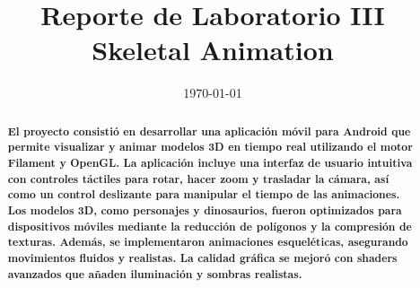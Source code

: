 \documentclass[conference]{IEEEtran}
\date{\specialdate\today}
\begin{document}
%
%
%

\newcommand{\breite}{0.9} %
\newcommand{\RelacionFiguradoscolumnas}{0.9}
\newcommand{\RelacionFiguradoscolumnasPuntoCinco}{0.45}




\title{Reporte de Laboratorio III \\  Skeletal Animation
}

\author{

}



\maketitle

\begin{abstract}  
\textbf{El proyecto consistió en desarrollar una aplicación móvil para Android que permite visualizar y animar modelos 3D en tiempo real utilizando el motor Filament y OpenGL. La aplicación incluye una interfaz de usuario intuitiva con controles táctiles para rotar, hacer zoom y trasladar la cámara, así como un control deslizante para manipular el tiempo de las animaciones. Los modelos 3D, como personajes y dinosaurios, fueron optimizados para dispositivos móviles mediante la reducción de polígonos y la compresión de texturas. Además, se implementaron animaciones esqueléticas, asegurando movimientos fluidos y realistas. La calidad gráfica se mejoró con shaders avanzados que añaden iluminación y sombras realistas. \cite{android-os}
}
\end{abstract}
\end{document}
